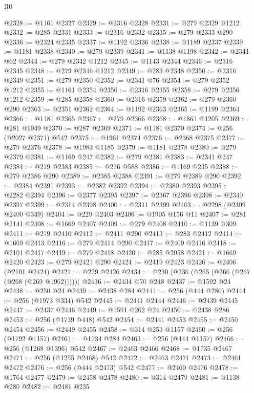 \begin{lexlean}{R0}
\begin{coremodule}
@2328 := @1161 @2327
@2329 := @2316 @2328
@2331 := @279 @2329 @1212
@2332 := @285 @2331
@2333 := @2316 @2332
@2335 := @279 @2333 @290
@2336 := @2324 @2335
@2337 := @1192 @2336
@2338 := @1189 @2337
@2339 := @1181 @2338
@2340 := @279 @2339
@2341 := @1138 @1198
@2342 := @2341 @62
@2344 := @279 @2342 @1212
@2345 := @1143 @2344
@2346 := @2316 @2345
@2348 := @279 @2346 @1212
@2349 := @283 @2348
@2350 := @2316 @2349
@2351 := @279 @2350
@2352 := @2341 @76
@2354 := @279 @2352 @1212
@2355 := @1161 @2354
@2356 := @2316 @2355
@2358 := @279 @2356 @1212
@2359 := @285 @2358
@2360 := @2316 @2359
@2362 := @279 @2360 @290
@2363 := @2351 @2362
@2364 := @1192 @2363
@2365 := @1199 @2364
@2366 := @1181 @2365
@2367 := @279 @2366
@2368 := @1861 @1205
@2369 := @281 @1949
@2370 := @287 @2369
@2371 := @1181 @2370
@2374 := @256 (@2027 @2371) @542
@2375 := @1961 @2374
@2376 := @2368 @2375
@2377 := @279 @2376
@2378 := @1983 @1185
@2379 := @1181 @2378
@2380 := @279 @2379
@2381 := @1169 @247
@2382 := @279 @2381
@2383 := @2341 @247
@2384 := @279 @2383
@2385 := @276 @588
@2386 := @1169 @235
@2388 := @279 @2386 @290
@2389 := @2385 @2388
@2391 := @279 @2389 @290
@2392 := @2384 @2391
@2393 := @2382 @2392
@2394 := @2380 @2393
@2395 := @2282 @2394
@2396 := @2377 @2395
@2397 := @2367 @2396
@2398 := @2340 @2397
@2399 := @2314 @2398
@2400 := @2311 @2399
@2403 := @2298 (@2309 @2400 @349)
@2404 := @229 @2403
@2406 := @1905 @156 @11
@2407 := @281 @2141
@2408 := @1669 @2407
@2409 := @279 @2408
@2410 := @1139 @309
@2411 := @279 @2410
@2412 := @2411 @290
@2413 := @283 @2412
@2414 := @1669 @2413
@2416 := @279 @2414 @290
@2417 := @2409 @2416
@2418 := @2101 @2417
@2419 := @279 @2418
@2420 := @285 @2058
@2421 := @1669 @2420
@2423 := @279 @2421 @290
@2424 := @2419 @2423
@2426 := @2406 (@2101 @2424)
@2427 := @229 @2426
@2434 := @230 (@236 (@265 (@266 (@267 (@268 (@269 @1962))))))
@2436 := @2434 @70 @248
@2437 := @1592 @24
@2438 := @250 @24
@2439 := @2438 @284
@2441 := @256 (@444 @280)
@2444 := @256 (@1973 @334) @542
@2445 := @2441 @2444
@2446 := @2439 @2445
@2447 := @2437 @2446
@2449 := @1591 @262 @24
@2450 := @2438 @286
@2453 := @256 (@1739 @448) @542
@2454 := @2441 @2453
@2455 := @2450 @2454
@2456 := @2449 @2455
@2458 := @314 @253 @1157
@2460 := @256 (@1792 @1157)
@2461 := @1734 @284
@2463 := @256 (@444 @1157)
@2466 := @256 (@1268 @1396) @542
@2467 := @2463 @2466
@2468 := @1735 @2467
@2471 := @256 (@1255 @2468) @542
@2472 := @2463 @2471
@2473 := @2461 @2472
@2476 := @256 (@444 @2473) @542
@2477 := @2460 @2476
@2478 := @1764 @2477
@2479 := @2458 @2478
@2480 := @314 @2479
@2481 := @1138 @280
@2482 := @2481 @235

\end{coremodule}
\end{lexlean}
